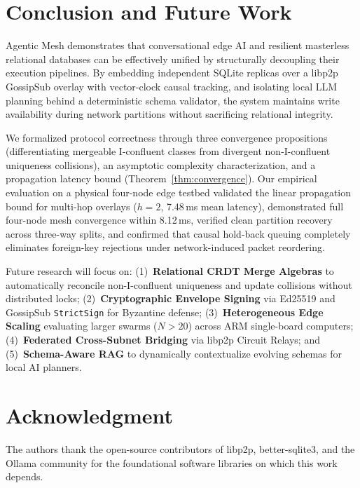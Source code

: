 \section{Conclusion and Future Work}
\label{sec:conclusion}

Agentic Mesh demonstrates that conversational edge AI and resilient masterless relational databases can be effectively unified by structurally decoupling their execution pipelines. By embedding independent SQLite replicas over a libp2p GossipSub overlay with vector-clock causal tracking, and isolating local LLM planning behind a deterministic schema validator, the system maintains write availability during network partitions without sacrificing relational integrity.

We formalized protocol correctness through three convergence propositions (differentiating mergeable I-confluent classes from divergent non-I-confluent uniqueness collisions), an asymptotic complexity characterization, and a propagation latency bound (Theorem~\ref{thm:convergence}). Our empirical evaluation on a physical four-node edge testbed validated the linear propagation bound for multi-hop overlays ($h=2$, 7.48\,ms mean latency), demonstrated full four-node mesh convergence within 8.12\,ms, verified clean partition recovery across three-way splits, and confirmed that causal hold-back queuing completely eliminates foreign-key rejections under network-induced packet reordering.

Future research will focus on: (1)~\textbf{Relational CRDT Merge Algebras} to automatically reconcile non-I-confluent uniqueness and update collisions without distributed locks; (2)~\textbf{Cryptographic Envelope Signing} via Ed25519 and GossipSub \texttt{StrictSign} for Byzantine defense; (3)~\textbf{Heterogeneous Edge Scaling} evaluating larger swarms ($N > 20$) across ARM single-board computers; (4)~\textbf{Federated Cross-Subnet Bridging} via libp2p Circuit Relays; and (5)~\textbf{Schema-Aware RAG} to dynamically contextualize evolving schemas for local AI planners.

\section*{Acknowledgment}
The authors thank the open-source contributors of libp2p, better-sqlite3, and the Ollama community for the foundational software libraries on which this work depends.

\balance




